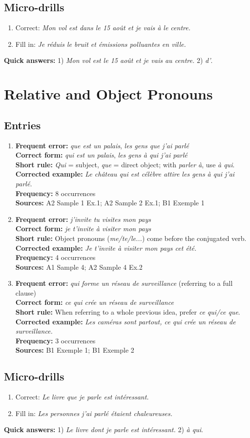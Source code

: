 \documentclass{article}
\newcommand{\mistakeentry}[6]{
\item \textbf{Frequent error:} #1\\
\textbf{Correct form:} #2\\
\textbf{Short rule:} #3\\
\textbf{Corrected example:} #4\\
\textbf{Frequency:} #5\\
\textbf{Sources:} #6
}
\begin{document}
\subsection*{Micro-drills}
\begin{enumerate}
    \item Correct: \textit{Mon vol est dans le 15 août et je vais à le centre.}
    \item Fill in: \textit{Je réduis le bruit et \underline{\hspace{1cm}} émissions polluantes en ville.}
\end{enumerate}
\textbf{Quick answers:} 1) \textit{Mon vol est le 15 août et je vais au centre.} 2) \textit{d'}.

\section{Relative and Object Pronouns}
\subsection*{Entries}
\begin{enumerate}
    \mistakeentry
    {\textit{que est un palais}, \textit{les gens que j'ai parlé}}
    {\textit{qui est un palais}, \textit{les gens à qui j'ai parlé}}
    {\textit{Qui} = subject, \textit{que} = direct object; with \textit{parler à}, use \textit{à qui}.}
    {\textit{Le château qui est célèbre attire les gens à qui j'ai parlé.}}
    {8 occurrences}
    {A2 Sample 1 Ex.1; A2 Sample 2 Ex.1; B1 Exemple 1}

    \mistakeentry
    {\textit{j'invite tu visites mon pays}}
    {\textit{je t'invite à visiter mon pays}}
    {Object pronouns (\textit{me/te/le...}) come before the conjugated verb.}
    {\textit{Je t'invite à visiter mon pays cet été.}}
    {4 occurrences}
    {A1 Sample 4; A2 Sample 4 Ex.2}

    \mistakeentry
    {\textit{qui forme un réseau de surveillance} (referring to a full clause)}
    {\textit{ce qui crée un réseau de surveillance}}
    {When referring to a whole previous idea, prefer \textit{ce qui/ce que}.}
    {\textit{Les caméras sont partout, ce qui crée un réseau de surveillance.}}
    {3 occurrences}
    {B1 Exemple 1; B1 Exemple 2}
\end{enumerate}

\subsection*{Micro-drills}
\begin{enumerate}
    \item Correct: \textit{Le livre que je parle est intéressant.}
    \item Fill in: \textit{Les personnes \underline{\hspace{1cm}} j'ai parlé étaient chaleureuses.}
\end{enumerate}
\textbf{Quick answers:} 1) \textit{Le livre dont je parle est intéressant.} 2) \textit{à qui}.
\end{document}
